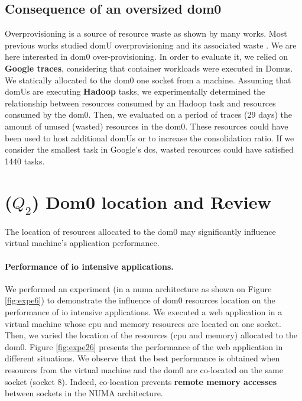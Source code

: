 \subsection{Consequence of an oversized dom0}
Overprovisioning is a source of resource waste as shown by many works. Most previous works studied domU overprovisioning and its associated waste \citep{predictability,predictability1,predictability4}. We are here interested in dom0 over-provisioning. In order to evaluate it, we relied on \textbf{Google traces}, considering that container workloads were executed in Domus. We statically allocated to the dom0 one socket from a machine. Assuming that domUs are executing \textbf{Hadoop} tasks, we experimentally determined the relationship between resources consumed by an Hadoop task and resources consumed by the dom0. Then, we evaluated on a period of traces (29 days) the amount of unused (wasted) resources in the dom0. These resources could have been used to host additional domUs or to increase the consolidation ratio. If we consider the smallest task in Google's \glspl{dc}, wasted resources could have satisfied 1440 tasks.

\section{($Q_2$) Dom0 location and Review}
The location of resources allocated to the dom0 may significantly influence virtual machine's application performance.


\paragraph{Performance of \acrshort{io} intensive applications.} We performed an experiment (in a \acrshort{numa} architecture as shown on Figure \ref{fig:expe6}) to demonstrate the influence of dom0 resources location on the performance of \acrshort{io} intensive applications. We executed a web application in a virtual machine whose \acrshort{cpu} and memory resources are located on one socket. Then, we varied the location of the resources (\acrshort{cpu} and memory) allocated to the dom0. Figure \ref{fig:expe26} presents the performance of the web application in different situations. We observe that the best performance is obtained when resources from the virtual machine and the dom0 are co-located on the same socket (socket 8). Indeed, co-location prevents \textbf{remote memory accesses} between sockets in the NUMA architecture.

